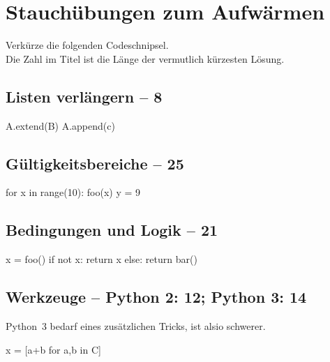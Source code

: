 \documentclass[a4paper, 14 pt]{extarticle}
\begin{document}
\section{Stauchübungen zum Aufwärmen}
Verkürze die folgenden Codeschnipsel.\\ Die Zahl im Titel ist die Länge der vermutlich kürzesten Lösung.

\subsection{Listen verlängern – 8}
\begin{python3code}
	A.extend(B)
	A.append(c)
\end{python3code}

\subsection{Gültigkeitsbereiche – 25}
\begin{python3code}
	for x in range(10):
		foo(x)
	y = 9
\end{python3code}

\subsection{Bedingungen und Logik – 21}
\begin{python3code}
	x = foo()
	if not x:
		return x
	else:
		return bar()
\end{python3code}
	
\subsection{Werkzeuge – Python 2: 12; Python 3: 14}
Python 3 bedarf eines zusätzlichen Tricks, ist alsio schwerer.
\begin{python3code}
	x = [a+b for a,b in C]
\end{python3code}
\end{document}
